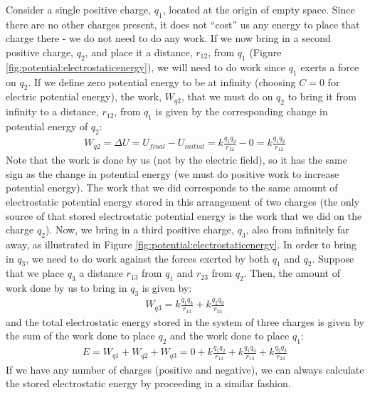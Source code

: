 Consider a single positive charge, $q_1$, located at the origin of empty space. Since there are no other charges present, it does not ``cost'' us any energy to place that charge there - we do not need to do any work. If we now bring in a second positive charge, $q_2$, and place it a distance, $r_{12}$, from $q_1$ (Figure \ref{fig:potential:electrostaticenergy}), we will need to do work since $q_1$ exerts a force on $q_2$. If we define zero potential energy to be at infinity (choosing $C=0$ for electric potential energy), the work, $W_{q2}$, that we must do on $q_2$ to bring it from infinity to a distance, $r_{12}$, from $q_1$ is given by the corresponding change in potential energy of $q_2$:
\begin{align*}
W_{q2}=\Delta U=U_{final}-U_{initial}=k\frac{q_1q_2}{r_{12}}-0=k\frac{q_1q_2}{r_{12}}
\end{align*}
Note that the work is done by us (not by the electric field), so it has the same sign as the change in potential energy (we must do positive work to increase potential energy). The work that we did corresponds to the same amount of electrostatic potential energy stored in this arrangement of two charges (the only source of that stored electrostatic potential energy is the work that we did on the charge $q_2$). 
Now, we bring in a third positive charge, $q_3$, also from infinitely far away, as illustrated in Figure \ref{fig:potential:electrostaticenergy}. In order to bring in $q_3$, we need to do work against the forces exerted by both $q_1$ and $q_2$. Suppose that we place $q_3$ a distance $r_{13}$ from $q_1$ and $r_{23}$ from $q_2$. Then, the amount of work done by us to bring in $q_3$ is given by:
\begin{align*}
W_{q3}=k\frac{q_1q_3}{r_{13}}+k\frac{q_2q_3}{r_{23}}
\end{align*}
and the total electrostatic energy stored in the system of three charges is given by the sum of the work done to place $q_2$ and the work done to place $q_1$:
\begin{align*}
E = W_{q1}+W_{q2}+W_{q3}=0+k\frac{q_1q_2}{r_{12}}+k\frac{q_1q_3}{r_{13}}+k\frac{q_2q_3}{r_{23}}
\end{align*}
If we have any number of charges (positive and negative), we can always calculate the stored electrostatic energy by proceeding in a similar fashion. 

